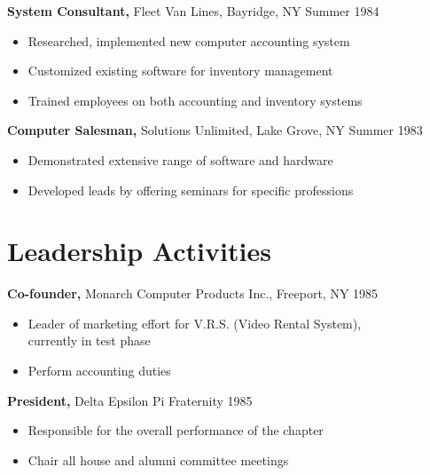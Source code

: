 \documentclass[margin]{res}
\begin{document}
\begin{resume}
{\bf System Consultant,} Fleet Van Lines, Bayridge, NY \hfill  Summer 1984
\begin{itemize} \itemsep -2pt %
\item Researched, implemented new computer accounting
                 system
\item Customized existing software for inventory
                 management
\item Trained employees on both accounting and inventory
                 systems
\end{itemize}

{\bf Computer Salesman,} Solutions Unlimited, Lake Grove, NY \hfill
Summer 1983
                \begin{itemize} \itemsep -2pt
                 \item  Demonstrated extensive range of software and
                 hardware

                 \item Developed leads by offering seminars for specific
                 professions

     \end{itemize}

\section{Leadership   Activities}
               {\bf Co-founder,} Monarch Computer Products Inc., Freeport, NY    \hfill         1985
                \begin{itemize} \itemsep -2pt
              \item Leader of marketing effort for V.R.S. (Video
                 Rental System), \\
                  currently in test phase

                \item  Perform accounting duties

     \end{itemize}

    {\bf President,} Delta Epsilon Pi Fraternity \hfill   1985
                \begin{itemize} \itemsep -2pt
                 \item  Responsible for the overall performance of the
                 chapter

                 \item Chair all house and alumni committee meetings


\end{itemize}
\end{resume}
\end{document}
